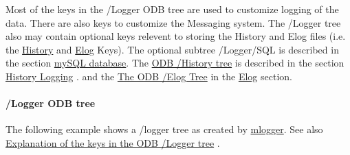 Most of the keys in the /Logger ODB tree are used to customize logging of the data. There are also keys to customize the Messaging system. The /Logger tree also may contain optional keys relevent to storing the History and Elog files (i.e. the \hyperlink{F_History_logging_F_Logger_History_Dir}{History} and \hyperlink{F_Elog_F_Logger_Elog_Dir}{Elog} Keys). The optional subtree /Logger/SQL is described in the section \hyperlink{F_mySQL}{mySQL database}. The \hyperlink{F_History_logging_F_ODB_History_tree}{ODB /History tree} is described in the section \hyperlink{F_History_logging}{History Logging} . and the \hyperlink{F_Elog_F_ODB_Elog_Tree}{The ODB /Elog Tree} in the \hyperlink{F_Elog}{Elog} section.

\label{F_Logging_Data_idx_ODB_tree_Logger}
\hypertarget{F_Logging_Data_idx_ODB_tree_Logger}{}
 \hypertarget{F_Logging_Data_F_Logger_tree}{}\paragraph{/Logger ODB tree}\label{F_Logging_Data_F_Logger_tree}
The following example shows a /logger tree as created by \hyperlink{F_Logging_F_mlogger_utility}{mlogger}. See also \hyperlink{F_Logging_Data_F_Logger_tree_keys}{Explanation of the keys in the ODB /Logger tree} .


